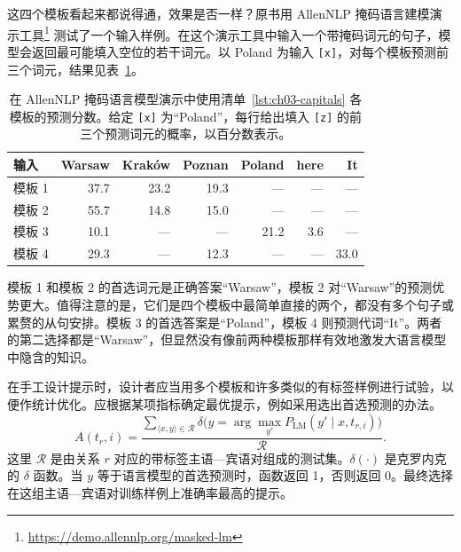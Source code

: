 这四个模板看起来都说得通，效果是否一样？原书用 AllenNLP 掩码语言建模演示工具\footnote{\url{https://demo.allennlp.org/masked-lm}} 测试了一个输入样例。在这个演示工具中输入一个带掩码词元的句子，模型会返回最可能填入空位的若干词元。以 Poland 为输入 \texttt{[x]}，对每个模板预测前三个词元，结果见表~\ref{tab:ch03-capitals}。

\begin{table}[!htbp]
\centering
\caption{在 AllenNLP 掩码语言模型演示中使用清单~\ref{lst:ch03-capitals} 各模板的预测分数。给定 \texttt{[x]} 为“Poland”，每行给出填入 \texttt{[z]} 的前三个预测词元的概率，以百分数表示。}
\label{tab:ch03-capitals}
\small
\begin{tabular}{@{}lrrrrrr@{}}
\toprule
输入 & Warsaw & Kraków & Poznan & Poland & here & It\\
\midrule
模板 1 & 37.7 & 23.2 & 19.3 & — & — & —\\
模板 2 & 55.7 & 14.8 & 15.0 & — & — & —\\
模板 3 & 10.1 & — & — & 21.2 & 3.6 & —\\
模板 4 & 29.3 & — & 12.3 & — & — & 33.0\\
\bottomrule
\end{tabular}
\end{table}

模板 1 和模板 2 的首选词元是正确答案“Warsaw”，模板 2 对“Warsaw”的预测优势更大。值得注意的是，它们是四个模板中最简单直接的两个，都没有多个句子或累赘的从句安排。模板 3 的首选答案是“Poland”，模板 4 则预测代词“It”。两者的第二选择都是“Warsaw”，但显然没有像前两种模板那样有效地激发大语言模型中隐含的知识。

在手工设计提示时，设计者应当用多个模板和许多类似的有标签样例进行试验，以便作统计优化。应根据某项指标确定最优提示，例如采用选出首选预测的办法。
\begin{equation}
A(t_r,i)=
\frac{\sum_{\langle x,y\rangle\in\mathcal{R}}
 \delta\bigl(y=\arg\max_{y'}P_{\mathrm{LM}}(y'\mid x,t_{r,i})\bigr)}
{\mathcal{R}}.
\tag{3.8}
\end{equation}
这里 $\mathcal{R}$ 是由关系 $r$ 对应的带标签主语—宾语对组成的测试集。$\delta(\cdot)$ 是克罗内克的 $\delta$ 函数。当 $y$ 等于语言模型的首选预测时，函数返回 1，否则返回 0。最终选择在这组主语—宾语对训练样例上准确率最高的提示。
